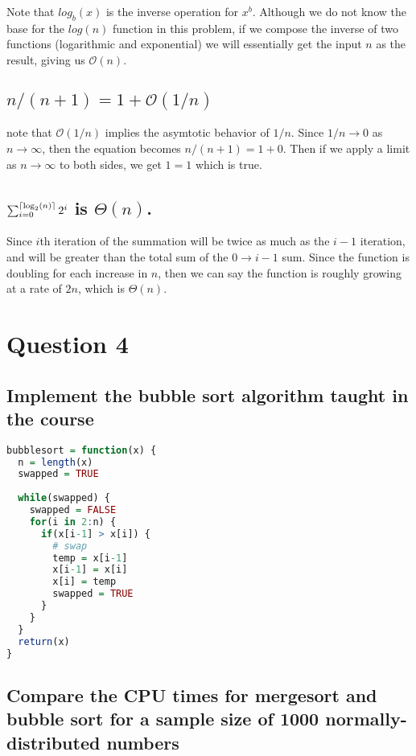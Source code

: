 \documentclass[20pt]{article} %
\DeclarePairedDelimiter\ceil{\lceil}{\rceil}
\begin{document}
Note that $log_b(x)$ is the inverse operation for $x^{b}$.  Although we do not know the base for the $log(n)$ function in this problem, if we compose the inverse of two functions (logarithmic and exponential) we will essentially get the input $n$ as the result, giving us $\mathcal{O}(n)$.

\subsection{$n/(n+1) = 1 + \mathcal{O}(1/n)$}
note that $\mathcal{O}(1/n)$ implies the asymtotic behavior of $1/n$.  Since $1/n \rightarrow 0$ as $n\rightarrow \infty$, then the equation becomes $n/(n+1) = 1 + 0$.  Then if we apply a limit as $n \rightarrow \infty$ to both sides, we get $1 =1$ which is true.

\subsection{$\sum_{i=0}^{\ceil{\log_2(n)}} 2^{i}$ is $\Theta(n)$.}

Since $i$th iteration of the summation will be twice as much as the $i-1$ iteration, and will be greater than the total sum of the $0 \rightarrow i-1$ sum.  Since the function is doubling for each increase in $n$, then we can say the function is roughly growing at a rate of $2n$, which is $\Theta(n)$.


\section{Question 4}

\subsection{Implement the bubble sort algorithm taught in the course}
\begin{lstlisting}[language=R]
bubblesort = function(x) {
  n = length(x)
  swapped = TRUE
  
  while(swapped) {
    swapped = FALSE
    for(i in 2:n) {
      if(x[i-1] > x[i]) {
        # swap 
        temp = x[i-1]
        x[i-1] = x[i]
        x[i] = temp
        swapped = TRUE
      }
    }
  }
  return(x)
}
\end{lstlisting}

\subsection{Compare the CPU times for mergesort and bubble sort for a sample size of 1000 normally-distributed numbers}
\end{document}
